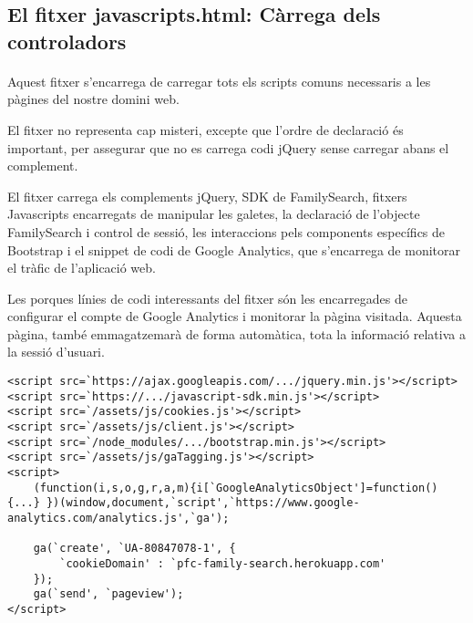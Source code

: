 \subsection{El fitxer javascripts.html: Càrrega dels controladors}

    \paragraph{}
    Aquest fitxer s'encarrega de carregar tots els scripts comuns necessaris a les pàgines del nostre domini web.

    El fitxer no representa cap misteri, excepte que l'ordre de declaració és important, per assegurar que no es carrega codi jQuery sense carregar abans el complement.

    El fitxer carrega els complements jQuery, SDK de FamilySearch, fitxers Javascripts encarregats de manipular les galetes, la declaració de l'objecte FamilySearch i control de sessió, les interaccions pels components específics de Bootstrap i el snippet de codi de Google Analytics, que s'encarrega de monitorar el tràfic de l'aplicació web.

    Les porques línies de codi interessants del fitxer són les encarregades de configurar el compte de Google Analytics i monitorar la pàgina visitada. Aquesta pàgina, també emmagatzemarà de forma automàtica, tota la informació relativa a la sessió d'usuari.

    \begin{lstlisting}[style=rawOwn,caption={Càrrega general de controladors per totes les pàgines}]
<script src=`https://ajax.googleapis.com/.../jquery.min.js'></script>
<script src=`https://.../javascript-sdk.min.js'></script>
<script src=`/assets/js/cookies.js'></script>
<script src=`/assets/js/client.js'></script>
<script src=`/node_modules/.../bootstrap.min.js'></script>
<script src=`/assets/js/gaTagging.js'></script>
<script>
    (function(i,s,o,g,r,a,m){i[`GoogleAnalyticsObject']=function(){...} })(window,document,`script',`https://www.google-analytics.com/analytics.js',`ga');

    ga(`create', `UA-80847078-1', {
        `cookieDomain' : `pfc-family-search.herokuapp.com'
    });
    ga(`send', `pageview');
</script>
    \end{lstlisting}
